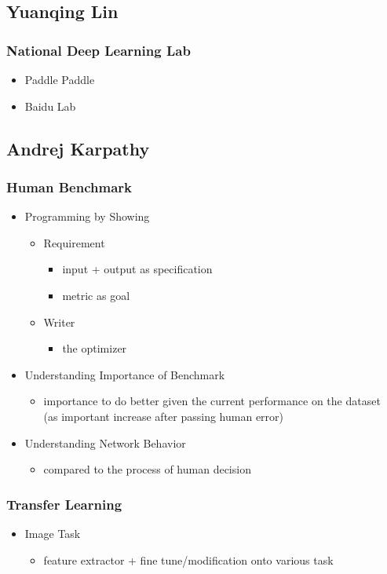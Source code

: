 \subsection{Yuanqing Lin}
\subsubsection{National Deep Learning Lab}
\begin{itemize}
\item Paddle Paddle
\item Baidu Lab
\end{itemize}

\subsection{Andrej Karpathy}
\subsubsection{Human Benchmark}
\begin{itemize}
\item Programming by Showing
	\begin{itemize}
	\item Requirement
		\begin{itemize}
		\item input + output as specification
		\item metric as goal
		\end{itemize}
	\item Writer
		\begin{itemize}
		\item the optimizer
		\end{itemize}
	\end{itemize}
\item Understanding Importance of Benchmark
	\begin{itemize}
	\item importance to do better given the current performance on the dataset \\
	(as important increase after passing human error)
	\end{itemize}
\item Understanding Network Behavior
	\begin{itemize}
	\item compared to the process of human decision
	\end{itemize}
\end{itemize}
\subsubsection{Transfer Learning}
\begin{itemize}
\item Image Task
	\begin{itemize}
	\item feature extractor + fine tune/modification onto various task
	\end{itemize}
\end{itemize}

